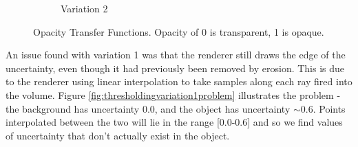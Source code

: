 \begin{figure}[H]
\begin{subfigure}[b]{0.5\textwidth}
    \caption{Variation 2}
    \label{fig:thresholdingvariation2}
  \end{subfigure}
  \caption{Opacity Transfer Functions. Opacity of 0 is transparent, 1 is opaque.}\label{fig:thresholdingoverview}
\end{figure}

An issue found with variation 1 was that the renderer still draws the edge of the uncertainty, even though it had previously been removed by erosion. This is due to the renderer using linear interpolation to take samples along each ray fired into the volume. Figure \ref{fig:thresholdingvariation1problem} illustrates the problem - the background has uncertainty 0.0, and the object has uncertainty $\sim$0.6. Points interpolated between the two will lie in the range [0.0-0.6] and so we find values of uncertainty that don't actually exist in the object.

